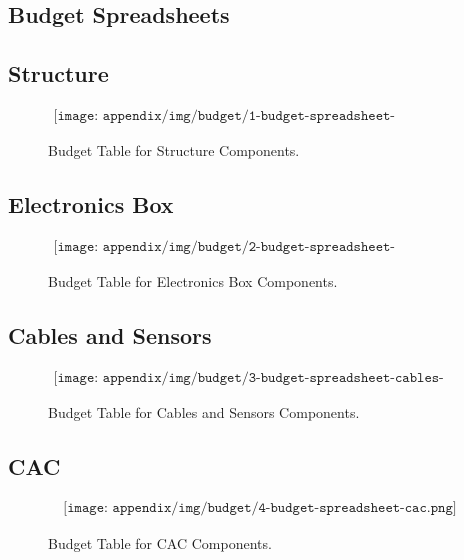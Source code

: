 
\begin{landscape}
\section{Budget Spreadsheets}
\label{sec:appO}

\subsection{Structure}


\begin{figure}[H]
    \begin{align*}
        \texttt{[image: appendix/img/budget/1-budget-spreadsheet-structure.png]}
    \end{align*}
    \caption{Budget Table for Structure Components.}
    \label{fig:budget-table-for-structure-components}
\end{figure}
\end{landscape}


\begin{landscape}
\subsection{Electronics Box}
\begin{figure}[H]
    \begin{align*}
        \texttt{[image: appendix/img/budget/2-budget-spreadsheet-electronics-box.png]}
    \end{align*}
    \caption{Budget Table for Electronics Box Components.}
    \label{fig:budget-table-for-electronics-box-components}
\end{figure}
\end{landscape}


\subsection{Cables and Sensors}
\begin{figure}[H]
    \begin{align*}
        \texttt{[image: appendix/img/budget/3-budget-spreadsheet-cables-and-sensors.png]}
    \end{align*}
    \caption{Budget Table for Cables and Sensors Components.}
    \label{fig:budget-table-for-cables-and-sensors-components}
\end{figure}


\begin{landscape}
\subsection{CAC}
\begin{figure}[H]
    \begin{align*}
        \texttt{[image: appendix/img/budget/4-budget-spreadsheet-cac.png]}
    \end{align*}
    \caption{Budget Table for CAC Components.}
    \label{fig:budget-table-for-structure-components}
\end{figure}
\end{landscape}


